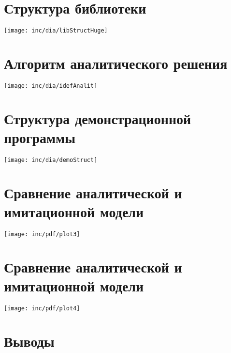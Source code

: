 \documentclass[12pt]{article}
\begin{document}
\section{Структура библиотеки}
\texttt{[image: inc/dia/libStructHuge]}


\section{Алгоритм аналитического решения}
\vfill
\texttt{[image: inc/dia/idefAnalit]}
\vfill

\section{Структура демонстрационной программы}
\texttt{[image: inc/dia/demoStruct]}





\section{Сравнение аналитической и имитационной модели}
\texttt{[image: inc/pdf/plot3]}

\section{Сравнение аналитической и имитационной модели}
\texttt{[image: inc/pdf/plot4]}



\section{Выводы}
\end{document}
